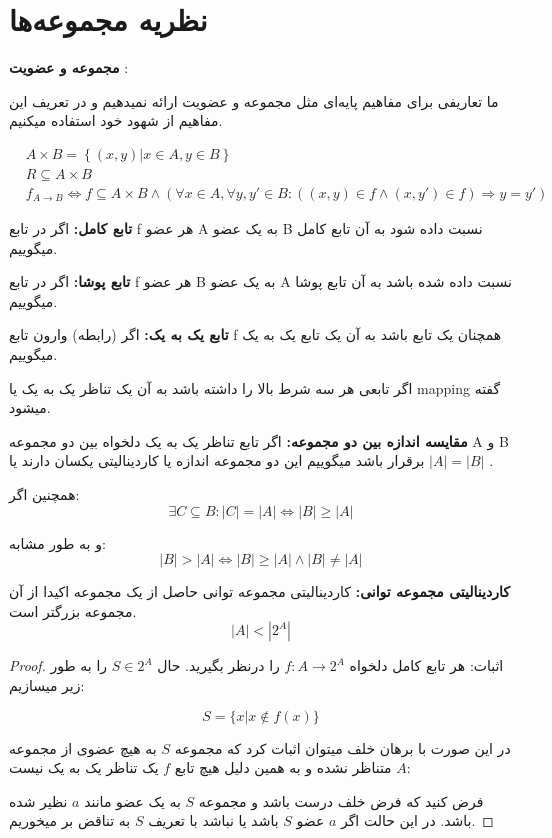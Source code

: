 \chapter{نظریه مجموعه‌ها}

\textbf{
    مجموعه و عضویت
}
:

ما تعاریفی برای مفاهیم پایه‌ای مثل مجموعه و عضویت ارائه نمیدهیم و در تعریف این مفاهیم از شهود خود استفاده میکنیم.

\begin{align*}
    &A \times B = \left\{ (x, y) | x \in A, y \in B\right\}\\
    &R \subseteq A \times B\\
    &f_{A \rightarrow B} \Longleftrightarrow f \subseteq A \times B \wedge \left( \forall x \in A, \forall y, y' \in B :
    \left((x, y) \in f \wedge (x, y') \in f\right) \Rightarrow y = y' \right)
\end{align*}

\textbf{تابع کامل:}
اگر در تابع 
f
هر عضو 
A
به یک عضو 
B
نسبت داده شود به آن تابع کامل میگوییم.


\textbf{تابع پوشا:}
اگر در تابع 
f
هر عضو 
B
به یک عضو 
A
نسبت داده شده باشد به آن تابع پوشا میگوییم.

\textbf{تابع یک‌ به‌ یک:}
اگر 
(رابطه)
وارون تابع 
f
همچنان یک تابع باشد به آن یک تابع یک به یک میگوییم.

اگر تابعی هر سه شرط بالا را داشته باشد به آن یک تناظر یک به یک یا
mapping
گفته میشود.

\textbf{مقایسه اندازه بین دو مجموعه:}
اگر تابع تناظر یک به یک دلخواه بین دو مجموعه 
A
و
B
برقرار باشد میگوییم این دو مجموعه اندازه یا کاردینالیتی یکسان دارند یا
$|A| = |B|$
.

همچنین اگر:
$$
\exists C \subseteq B : |C| = |A| \Longleftrightarrow |B| \geq |A|
$$

و به طور مشابه:
$$
|B| > |A| \Longleftrightarrow |B| \geq |A| \wedge |B| \neq |A|
$$

\textbf{
کاردینالیتی مجموعه توانی:
}
کاردینالیتی مجموعه توانی حاصل از  یک مجموعه اکیدا از آن مجموعه بزرگتر است.
$$
|A| < |2^A|
$$

\begin{proof}
اثبات:
هر تابع کامل دلخواه 
$f:A \rightarrow 2^A$
را درنظر بگیرید. حال
$S \in 2^A$
را به طور زیر میسازیم:

$$
S = \{x | x \notin f(x) \}
$$

در این صورت با برهان خلف میتوان اثبات کرد که مجموعه 
$S$
به هیچ عضوی از مجموعه 
$A$
متناظر نشده و به همین دلیل هیچ تابع 
$f$
یک تناظر یک به یک نیست:

فرض کنید که فرض خلف درست باشد و مجموعه 
$S$
به یک عضو مانند 
$a$
نظیر شده باشد. در این حالت اگر 
$a$
عضو 
$S$
باشد یا نباشد با تعریف 
$S$
به تناقض بر میخوریم.

\end{proof}

